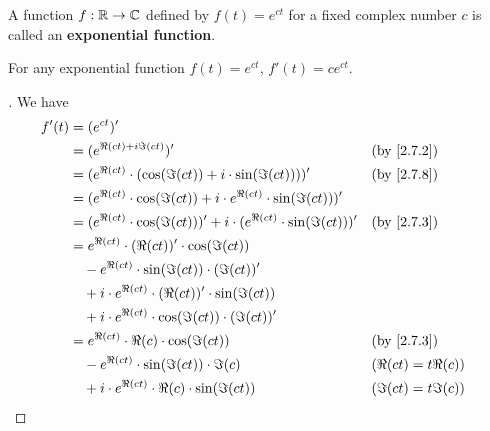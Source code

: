 \begin{defn}\label{2.7.9}
  A function \(f : \mathbb{R} \to \mathbb{C}\) defined by \(f(t) = e^{ct}\) for a fixed complex number \(c\) is called an \textbf{exponential function}.
\end{defn}

\begin{thm}\label{2.29}
  For any exponential function \(f(t) = e^{ct}\), \(f'(t) = c e^{ct}\).
\end{thm}

\begin{proof}[]
  We have
  \begin{align*}
    f'(t) & = (e^{ct})'                                                                                                     \\
          & = (e^{\Re(ct) + i \Im(ct)})'                                                      &  & \text{(by \cref{2.7.2})} \\
          & = (e^{\Re(ct)} \cdot (\cos(\Im(ct)) + i \cdot \sin(\Im(ct))))'                    &  & \text{(by \cref{2.7.8})} \\
          & = (e^{\Re(ct)} \cdot \cos(\Im(ct)) + i \cdot e^{\Re(ct)} \cdot \sin(\Im(ct)))'                                  \\
          & = (e^{\Re(ct)} \cdot \cos(\Im(ct)))' + i \cdot (e^{\Re(ct)} \cdot \sin(\Im(ct)))' &  & \text{(by \cref{2.7.3})} \\
          & = e^{\Re(ct)} \cdot (\Re(ct))' \cdot \cos(\Im(ct))                                                              \\
          & \quad - e^{\Re(ct)} \cdot \sin(\Im(ct)) \cdot (\Im(ct))'                                                        \\
          & \quad + i \cdot e^{\Re(ct)} \cdot (\Re(ct))' \cdot \sin(\Im(ct))                                                \\
          & \quad + i \cdot e^{\Re(ct)} \cdot \cos(\Im(ct)) \cdot (\Im(ct))'                                                \\
          & = e^{\Re(ct)} \cdot \Re(c) \cdot \cos(\Im(ct))                                    &  & \text{(by \cref{2.7.3})} \\
          & \quad - e^{\Re(ct)} \cdot \sin(\Im(ct)) \cdot \Im(c)                              &  & (\Re(ct) = t \Re(c))     \\
          & \quad + i \cdot e^{\Re(ct)} \cdot \Re(c) \cdot \sin(\Im(ct))                      &  & (\Im(ct) = t \Im(c))     \\

\end{align*}
\end{proof}
